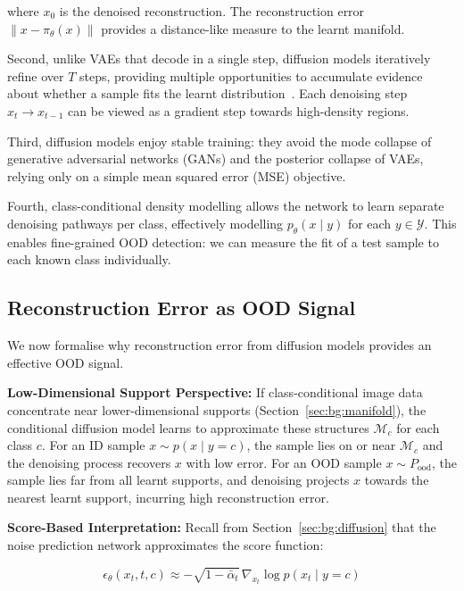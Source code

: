 where $x_0$ is the denoised reconstruction. The reconstruction error $\|x - \pi_\theta(x)\|$ provides a distance-like measure to the learnt manifold.

Second, unlike VAEs that decode in a single step, diffusion models iteratively refine over $T$ steps, providing multiple opportunities to accumulate evidence about whether a sample fits the learnt distribution~\cite{wyatt2022anoddpm, graham2023denoising}. Each denoising step $x_t \to x_{t-1}$ can be viewed as a gradient step towards high-density regions.

Third, diffusion models enjoy stable training: they avoid the mode collapse of generative adversarial networks (GANs) and the posterior collapse of VAEs, relying only on a simple mean squared error (MSE) objective.

Fourth, class-conditional density modelling allows the network to learn separate denoising pathways per class, effectively modelling $p_\theta(x \mid y)$ for each $y \in \mathcal{Y}$. This enables fine-grained OOD detection: we can measure the fit of a test sample to each known class individually.

\subsection{Reconstruction Error as OOD Signal}
\label{sec:meth:diffusion:signal}

We now formalise why reconstruction error from diffusion models provides an effective OOD signal.

\textbf{Low-Dimensional Support Perspective:} If class-conditional image data concentrate near lower-dimensional supports (Section~\ref{sec:bg:manifold}), the conditional diffusion model learns to approximate these structures $\mathcal{M}_c$ for each class $c$. For an ID sample $x \sim p(x \mid y = c)$, the sample lies on or near $\mathcal{M}_c$ and the denoising process recovers $x$ with low error. For an OOD sample $x \sim P_{\text{ood}}$, the sample lies far from all learnt supports, and denoising projects $x$ towards the nearest learnt support, incurring high reconstruction error.

\textbf{Score-Based Interpretation:} Recall from Section~\ref{sec:bg:diffusion} that the noise prediction network approximates the score function:

\begin{equation}
\label{eq:meth:score_interp}
\epsilon_\theta(x_t, t, c) \approx -\sqrt{1 - \bar{\alpha}_t}\, \nabla_{x_t} \log p(x_t \mid y = c)
\end{equation}

